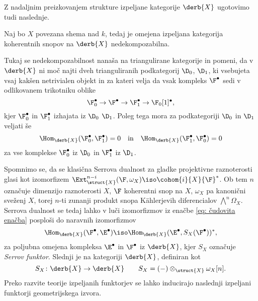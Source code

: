 Z nadaljnim preizkovanjem strukture izpeljane kategorije $\derb{X}$ ugotovimo tudi naslednje.

\begin{izrek}
    \emph{\cite[\S 3, Proposition 3.10]{huybrechts2006fouriermukai}}
    Naj bo $X$ povezana shema nad $k$, tedaj je omejena izpeljana kategorija koherentnih snopov na $\derb{X}$ nedekompozabilna. 
\end{izrek}

Tukaj se nedekompozabilnost nanaša na triangulirane kategorije in pomeni, da v $\derb{X}$ ni moč najti dveh trianguliranih podkategorij $\D_0$, $\D_1$, ki vsebujeta vsaj kakšen netrivialen objekt in za kateri velja da vsak kompleks $\F^\bullet$ sedi v odlikovanem trikotniku oblike 
\[
    \F_0^\bullet \to \F^\bullet \to \F_1^\bullet \to \F_0[1]^\bullet,
\]
kjer $\F_0^\bullet$ in $\F_1^\bullet$ izhajata iz $\D_0$ \oz $\D_1$. Poleg tega mora za podkategoriji $\D_0$ in $\D_1$ veljati še 
\begin{equation*}
    \Hom_{\derb{X}}(\F_0^\bullet, \F_1^\bullet) = 0 \quad \text{in} \quad 
    \Hom_{\derb{X}}(\F_1^\bullet, \F_0^\bullet) = 0
\end{equation*}  
za vse komplekse $\F_0^\bullet$ iz $\D_0$ in $\F_1^\bullet$ iz $\D_1$.

Spomnimo se, da se klasična Serrova dualnost za gladke projektivne raznoterosti glasi kot izomorfizem $\Ext_{\struct{X}}^{n-i}(\F, \omega_X) \iso \cohom{i}{X}{\F}^*$. Ob tem $n$ označuje dimenzijo raznoterosti $X$, $\F$ koherentni snop na $X$, $\omega_X$ pa kanonični sveženj $X$, torej $n$-ti zunanji produkt snopa Kählerjevih diferencialov $\bigwedge^n \Omega_X$. Serrova dualnost se tedaj lahko v luči izomorfizmov iz enačbe \eqref{eq: čudovita enačba} posploši do naravnih izomorfizmov 
\[
    \Hom_{\derb{X}}(\F^\bullet, \E^\bullet) \iso \Hom_{\derb{X}}(\E^\bullet, S_X(\F^\bullet))^*,  
\]
za poljubna omejena kompleksa $\E^\bullet$ in $\F^\bullet$ iz $\derb{X}$, kjer $S_X$ označuje \ti \emph{Serrov funktor}. Slednji je na kategoriji $\derb{X}$, definiran kot 
\[
    S_X \colon \derb{X} \to \derb{X} \qquad S_X = (-) \otimes_{\struct{X}} \omega_X[n].
\]
Preko razvite teorije izpeljanih funktorjev se lahko inducirajo naslednji izpeljani funktorji geometrijskega izvora. 

